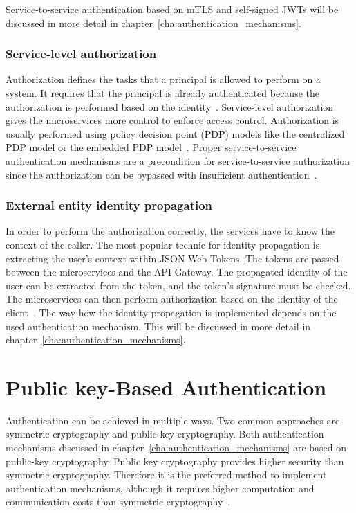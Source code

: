 Service-to-service authentication based on mTLS and self-signed JWTs will be discussed in more detail in chapter~\ref{cha:authentication_mechanisms}.

\subsubsection{Service-level authorization} 
\label{sec:service-level-authorization}
Authorization defines the tasks that a principal is allowed to perform on a system.
It requires that the principal is already authenticated because the authorization is performed based on the identity~\cite{siriwardena2014advanced}. 
Service-level authorization gives the microservices more control to enforce access control.
Authorization is usually performed using policy decision point (PDP) models like the centralized PDP model or the embedded PDP model~\cite{dias2020microservices, barabanov2020authentication}.
Proper service-to-service authentication mechanisms are a precondition for service-to-service authorization since the authorization can be bypassed with insufficient authentication~\cite{siriwardena2014advanced}.

\subsubsection{External entity identity propagation} 
\label{sec:external-entity-identity-propagation}
In order to perform the authorization correctly, the services have to know the context of the caller.
The most popular technic for identity propagation is extracting the user's context within JSON Web Tokens.
The tokens are passed between the microservices and the API Gateway.
The propagated identity of the user can be extracted from the token, and the token's signature must be checked.
The microservices can then perform authorization based on the identity of the client~\cite{barabanov2020authentication, dias2020microservices}.
The way how the identity propagation is implemented depends on the used authentication mechanism.
This will be discussed in more detail in chapter~\ref{cha:authentication_mechanisms}.

\section{Public key-Based Authentication}
Authentication can be achieved in multiple ways.
Two common approaches are symmetric cryptography and public-key cryptography.
Both authentication mechanisms discussed in chapter~\ref{cha:authentication_mechanisms} are based on public-key cryptography.
Public key cryptography provides higher security than symmetric cryptography.
Therefore it is the preferred method to implement authentication mechanisms, although it requires higher computation and communication costs than symmetric cryptography~\cite{pubkeycrypto}.

